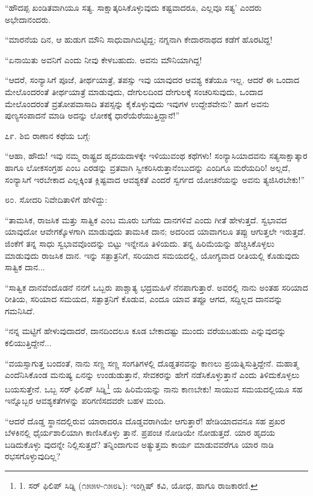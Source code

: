 “ಹೌದಪ್ಪ ಖಂಡಿತವಾಗಿಯೂ ಸತ್ಯ. ಸಾಕ್ಷಾತ್ಕರಿಸಿಕೊಳ್ಳುವುದು ಕಷ್ಟವಾದರೂ, ಎಲ್ಲವೂ ಸತ್ಯ’ ಎಂದರು ಅಭೇದಾನಂದರು.

“ಮಾರನೆಯ ದಿನ, ಆ ಹುಡುಗ ಮೌನಿ ಸಾಧುವಾಗಿಬಿಟ್ಟಿದ್ದ; ನಗ್ನನಾಗಿ ಕೇದಾರನಾಥದ ಕಡೆಗೆ ಹೊರಟಿದ್ದ!

“ಏನಾಯಿತು ಅವನಿಗೆ ಎಂದು ನೀವು ಕೇಳಬಹುದು. ಅವನು ಮೌನಿಯಾಗಿದ್ದ!

“ಆದರೆ, ಸಂನ್ಯಾಸಿಗೆ ಪೂಜೆ, ತೀರ್ಥಯಾತ್ರೆ, ತಪಸ್ಸು ಇವು ಯಾವುದರ ಆವಶ್ಯ ಕತೆಯೂ ಇಲ್ಲ. ಆದರೆ ಈ ಒಂದಾದ ಮೇಲೊಂದರಂತೆ ತೀರ್ಥಯಾತ್ರೆ ಮಾಡುವುದು, ದೇಗುಲದಿಂದ ದೇಗುಲಕ್ಕೆ ಸಂಚರಿಸುವುದು, ಒಂದಾದ ಮೇಲೊಂದರಂತೆ ವ್ರತೋಪವಾಸಾದಿ ತಪಸ್ಸನ್ನು ಕೈಕೊಳ್ಳುವುದು ಇವುಗಳ ಉದ್ದೇಶವೇನು? ಹಾಗೆ ಅವನು ಪುಣ್ಯಸಂಪಾದನೆ ಮಾಡಿ ಅದನ್ನು ಲೋಕಕ್ಕೆ ಧಾರೆಯೆರೆಯುತ್ತಿದ್ದಾನೆ!” 

೭೯. ಶಿಬಿ ರಾಣಾನ ಕಥೆಯ ಬಗ್ಗೆ:

“ಆಹಾ, ಹೌದು! ಇವು ನಮ್ಮ ರಾಷ್ಟ್ರದ ಹೃದಯದಾಳಕ್ಕೇ ಇಳಿಯುವಂಥ ಕಥೆಗಳು! ಸಂನ್ಯಾಸಿಯಾದವನು ಸತ್ಯಸಾಕ್ಷಾತ್ಕಾರ ಹಾಗೂ ಲೋಕಸಂಗ್ರಹ ಎಂಬ ಎರಡನ್ನು ವ್ರತವಾಗಿ ಸ್ವೀಕರಿಸಿರುತ್ತಾನೆಂಬುದನ್ನು ಎಂದಿಗೂ ಮರೆಯದಿರಿ! ಅಲ್ಲದೆ, ಸಂನ್ಯಾಸಿಗೆ ಇರಬೇಕಾದ ಎಲ್ಲಕ್ಕಿಂತ ಕ್ಲಿಷ್ಟವಾದ ಆವಶ್ಯಕತೆ ಎಂದರೆ ಸ್ವರ್ಗದ ಯೋಚನೆಯನ್ನು ಅವನು ತ್ಯಜಿಸಿರಬೇಕು!” 

೮೦. ಸೋದರಿ ನಿವೇದಿತಾಳಿಗೆ ಹೇಳಿದ್ದು:

“ತಾಮಸಿಕ, ರಾಜಸಿಕ ಮತ್ತು ಸಾತ್ವಿಕ ಎಂಬ ಮೂರು ಬಗೆಯ ದಾನಗಳಿವೆ ಎಂದು ಗೀತೆ ಹೇಳುತ್ತದೆ. ಸ್ವಭಾವದ ಯಾವುದೋ ಆವೇಗಕ್ಕೊಳಗಾಗಿ ಮಾಡುವುದು ತಾಮಸಿಕ ದಾನ; ಅದರಿಂದ ಯಾವಾಗಲೂ ತಪ್ಪು ಆಗುತ್ತಲೇ ಇರುತ್ತದೆ. ಜಿಂಕೆಗೆ ತನ್ನ ಸಾಧು ಸ್ವಭಾವವೊಂದನ್ನು ಬಿಟ್ಟು ಇನ್ನೇನೂ ತಿಳಿಯದು. ತನ್ನ ಹಿರಿಮೆಯನ್ನು ಹೆಚ್ಚಿಸಿಕೊಳ್ಳಲು ಮಾಡುವುದು ರಾಜಸಿಕ ದಾನ. ಇನ್ನು ಸತ್ಪಾತ್ರನಿಗೆ, ಸರಿಯಾದ ಸಮಯದಲ್ಲಿ, ಯೋಗ್ಯವಾದ ರೀತಿಯಲ್ಲಿ ಕೊಡುವುದು ಸಾತ್ವಿಕ ದಾನ...

“ಸಾತ್ವಿಕ ದಾನವೆಂದೊಡನೆ ನನಗೆ ಒಬ್ಬರು ಪಾಶ್ಚಾತ್ಯ ಭದ್ರಮಹಿಳೆ ನೆನಪಾಗುತ್ತಾರೆ. ಅವರಲ್ಲಿ ನಾನು ಅಂತಹ ಸರಿಯಾದ ರೀತಿಯ, ಸರಿಯಾದ ಸಮಯದ, ಸತ್ಪಾತ್ರನಿಗೆ ಕೊಡುವ, ಎಂದೂ ಯಾವ ತಪ್ಪೂ ಆಗದ, ಸದ್ದಿಲ್ಲದ ದಾನವನ್ನು ಗಮನಿಸಿದೆ.

“ನನ್ನ ಮಟ್ಟಿಗೆ ಹೇಳುವುದಾದರೆ, ದಾನದಿಂದಲೂ ಕೂಡ ಬೇಕಾದಷ್ಟು ಮುಂದು ವರೆಯಬಹುದು ಎನ್ನುವುದನ್ನು ಕಲಿಯುತ್ತಿದ್ದೇನೆ...

“ವಯಸ್ಸಾಗುತ್ತ ಬಂದಂತೆ, ನಾನು ಸಣ್ಣ ಸಣ್ಣ ಸಂಗತಿಗಳಲ್ಲಿ ದೊಡ್ಡತನವನ್ನು ಕಾಣಲು ಪ್ರಯತ್ನಿಸುತ್ತಿದ್ದೇನೆ. ಮಹಾತ್ಮ ಎಂದೆನಿಸಿಕೊಂಡ ಮನುಷ್ಯ ಏನನ್ನು ಉಂಡುಡುತ್ತಾನೆ, ಸೇವಕರನ್ನು ಹೇಗೆ ನಡೆಸಿಕೊಳ್ಳುತ್ತಾನೆ ಎಂದು ತಿಳಿದುಕೊಳ್ಳಲು ಬಯಸುತ್ತೇನೆ. ಒಬ್ಬ ಸರ್ ಫಿಲಿಪ್ ಸಿಡ್ನಿ\footnote{1. ಸರ್ ಫಿಲಿಪ್ ಸಿಡ್ನಿ (೧೫೫೪-೧೫೮೬): ಇಂಗ್ಲಿಷ್ ಕವಿ, ಯೋಧ, ಹಾಗೂ ರಾಜಕಾರಣಿ.} ಯ ಹಿರಿಮೆಯನ್ನು ನಾನು ಕಾಣಬೇಕು! ಸಾಯುವ ಸಮಯದಲ್ಲಿಯೂ ಸಹ ಇನ್ನೊಬ್ಬರ ಆವಶ್ಯಕತೆಗಳನ್ನು ಪರಿಗಣಿಸದವರೇ ಬಹಳ ಮಂದಿ.

“ಆದರೆ ದೊಡ್ಡ ಸ್ಥಾನದಲ್ಲಿರುವ ಯಾರಾದರೂ ದೊಡ್ಡವರಾಗಿಯೇ ಆಗುತ್ತಾರೆ! ಹೇಡಿಯಾದವನೂ ಸಹ ಪ್ರಖರ ಬೆಳಕಿನಲ್ಲಿ ಧೈರ್ಯಶಾಲಿಯಾಗಿ ಕಾಣಿಸಿಕೊಳ್ಳು ತ್ತಾನೆ. ಪ್ರಪಂಚ ನೋಡಿಯೇ ನೋಡುತ್ತದೆ. ಯಾರ ಹೃದಯ ಬಡಿದುಕೊಳ್ಳು ವುದನ್ನೇ ನಿಲ್ಲಿಸುತ್ತದೆ? ತನ್ನಿಂದಾಗುವ ಅತ್ಯುತ್ತಮ ಕಾರ್ಯ ಮಾಡುವವರೆಗೂ ಯಾರ ನಾಡಿ ರಭಸಗೊಳ್ಳುವುದಿಲ್ಲ?

